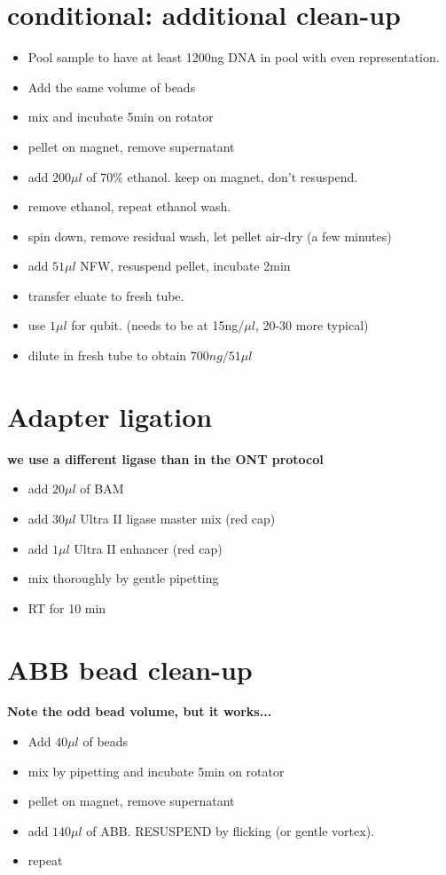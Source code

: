 \documentclass[aps,rmp]{revtex4}
\begin{document}
\section*{conditional: additional clean-up}
\begin{itemize}
	\item Pool sample to have at least 1200ng DNA in pool with even representation.
	\item Add the same volume of beads
	\item mix and incubate 5min on rotator
	\item pellet on magnet, remove supernatant
	\item add $200\mu l$ of 70\% ethanol. keep on magnet, don't resuspend.
	\item remove ethanol, repeat ethanol wash.
	\item spin down, remove residual wash, let pellet air-dry (a few minutes)
	\item add $51\mu l$ NFW, resuspend pellet, incubate 2min
	\item transfer eluate to fresh tube.
	\item use $1\mu l$ for qubit. (needs to be at 15ng/$\mu l$, 20-30 more typical)
	\item dilute in fresh tube to obtain $700ng/51\mu l$
\end{itemize}


\section*{Adapter ligation}
{\bf we use a different ligase than in the ONT protocol}
\begin{itemize}
	\item add $20\mu l$ of BAM
	\item add $30\mu l$ Ultra II ligase master mix  (red cap)
	\item add $1\mu l$ Ultra II enhancer (red cap)
	\item mix thoroughly by gentle pipetting
	\item RT for 10 min
\end{itemize}


\section*{ABB bead clean-up}
{\bf Note the odd bead volume, but it works...}
\begin{itemize}
	\item Add $40\mu l$ of beads
	\item mix by pipetting and incubate 5min on rotator
	\item pellet on magnet, remove supernatant
	\item add $140\mu l$ of ABB. RESUSPEND by flicking (or gentle vortex).
	\item repeat
\end{itemize}
\end{document}
